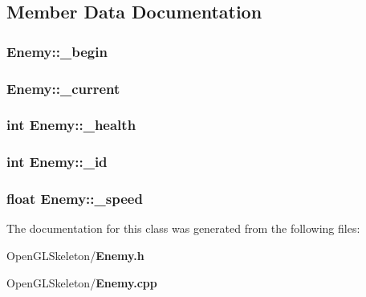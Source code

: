 \subsection{Member Data Documentation}
\subsubsection[{\+\_\+begin}]{ Enemy\+::\+\_\+begin}\label{class_enemy_a01a372cdebe6f7c5aa819aff02e3d817}
\subsubsection[{\+\_\+current}]{ Enemy\+::\+\_\+current}\label{class_enemy_a2e53518ca8125c08fd204e3bf810fc8d}
\subsubsection[{\+\_\+health}]{\setlength{\rightskip}{0pt plus 5cm}int Enemy\+::\+\_\+health}\label{class_enemy_a410845277e89ce6c73b2df15d0621cf7}
\subsubsection[{\+\_\+id}]{\setlength{\rightskip}{0pt plus 5cm}int Enemy\+::\+\_\+id}\label{class_enemy_abb5f5667c06218536bf516b249d2d4cb}
\subsubsection[{\+\_\+speed}]{\setlength{\rightskip}{0pt plus 5cm}float Enemy\+::\+\_\+speed}\label{class_enemy_a5ad8a827b28dd24331a434d1993d5c01}


The documentation for this class was generated from the following files\+:\begin{DoxyCompactItemize}
\item 
Open\+G\+L\+Skeleton/{\bf Enemy.\+h}\item 
Open\+G\+L\+Skeleton/{\bf Enemy.\+cpp}\end{DoxyCompactItemize}
